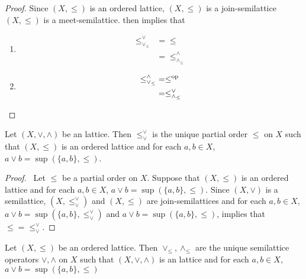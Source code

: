 \documentclass{book}
\begin{document}
	\begin{proof}
		Since $(X, \leq)$ is an ordered lattice, $(X, \leq)$ is a join-semilattice $(X, \leq)$ is a meet-semilattice.  then implies that 
		\begin{enumerate}
			\item 
			\begin{align*}
				\leq_{\vee_{\leq}}^{\vee} 
				& = \leq \\
				& = \leq_{\wedge_{\leq}}^{\wedge} 
			\end{align*}
			\item 
			\begin{align*}
				\leq_{\vee_{\leq}}^{\wedge}
				& = \leq^{\text{op}} \\
				& = \leq_{\wedge_{\leq}}^{\vee}
			\end{align*}
		\end{enumerate}
	\end{proof}
	
	\begin{ex} 
		Let $(X, \vee, \wedge)$ be an lattice. Then
		$\leq_{\vee}^{\vee}$ is the unique partial order ${\leq}$ on $X$ such that $(X, \leq)$ is an ordered lattice and for each $a,b \in X$, $a \vee b = \sup (\{a,b\}, \leq)$.
	\end{ex}
	
	\begin{proof}\
		Let $\leq$ be a partial order on $X$. Suppose that $(X, \leq)$ is an ordered lattice and for each $a,b \in X$, $a \vee b = \sup (\{a,b\}, \leq)$. Since $(X, \vee)$ is a semilattice, $(X, \leq_{\vee}^{\vee})$ and $(X, \leq)$ are join-semilattices and for each $a,b \in X$, $a \vee b = \sup(\{a,b\}, \leq_{\vee}^{\vee})$ and $a \vee b = \sup (\{a,b\}, \leq)$,  implies that ${\leq} = {\leq_{\vee}^{\vee}}$.
	\end{proof}
	
	\begin{ex}  
		Let $(X, \leq)$ be an ordered lattice. Then $\vee_{\leq}, \wedge_{\leq}$ are the unique semilattice operators $\vee, \wedge$ on $X$ such that $(X, \vee, \wedge)$ is an lattice and for each $a,b \in X$, $a \vee b = \sup(\{a,b\}, \leq)$
	\end{ex}
	
\end{document}
